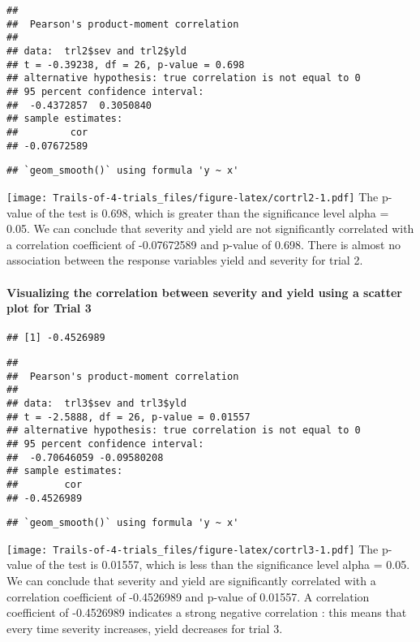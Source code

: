 \documentclass[
]{article}
\begin{document}
\begin{verbatim}
## 
##  Pearson's product-moment correlation
## 
## data:  trl2$sev and trl2$yld
## t = -0.39238, df = 26, p-value = 0.698
## alternative hypothesis: true correlation is not equal to 0
## 95 percent confidence interval:
##  -0.4372857  0.3050840
## sample estimates:
##         cor 
## -0.07672589
\end{verbatim}

\begin{verbatim}
## `geom_smooth()` using formula 'y ~ x'
\end{verbatim}

\texttt{[image: Trails-of-4-trials\_files/figure-latex/cortrl2-1.pdf]}
The p-value of the test is 0.698, which is greater than the significance
level alpha = 0.05. We can conclude that severity and yield are not
significantly correlated with a correlation coefficient of -0.07672589
and p-value of 0.698. There is almost no association between the
response variables yield and severity for trial 2.

\hypertarget{visualizing-the-correlation-between-severity-and-yield-using-a-scatter-plot-for-trial-3}{%
\paragraph{Visualizing the correlation between severity and yield using
a scatter plot for Trial
3}\label{visualizing-the-correlation-between-severity-and-yield-using-a-scatter-plot-for-trial-3}}

\begin{verbatim}
## [1] -0.4526989
\end{verbatim}

\begin{verbatim}
## 
##  Pearson's product-moment correlation
## 
## data:  trl3$sev and trl3$yld
## t = -2.5888, df = 26, p-value = 0.01557
## alternative hypothesis: true correlation is not equal to 0
## 95 percent confidence interval:
##  -0.70646059 -0.09580208
## sample estimates:
##        cor 
## -0.4526989
\end{verbatim}

\begin{verbatim}
## `geom_smooth()` using formula 'y ~ x'
\end{verbatim}

\texttt{[image: Trails-of-4-trials\_files/figure-latex/cortrl3-1.pdf]}
The p-value of the test is 0.01557, which is less than the significance
level alpha = 0.05. We can conclude that severity and yield are
significantly correlated with a correlation coefficient of -0.4526989
and p-value of 0.01557. A correlation coefficient of -0.4526989
indicates a strong negative correlation : this means that every time
severity increases, yield decreases for trial 3.
\end{document}

